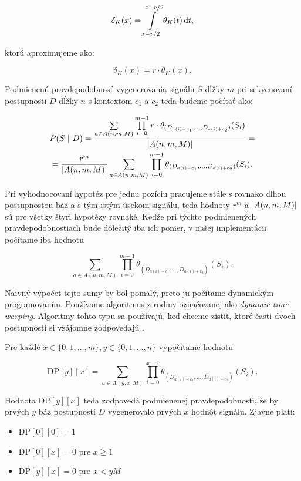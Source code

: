 $$\delta_K(x) = \int\limits_{x-r/2}^{x+r/2} \theta_K(t) \diff t \text{,}$$

ktorú aproximujeme ako:

$$\delta_K(x) = r \cdot \theta_K(x) \text{.}$$

Podmienenú pravdepodobnosť vygenerovania signálu $S$ dĺžky $m$ pri sekvenovaní postupnosti $D$ dĺžky $n$ s kontextom 
$c_1$ a $c_2$ teda budeme počítať ako:

\begin{multline*}
P(S ~|~ D) = \frac{\sum\limits_{a \in A(n, m, M)} \prod\limits_{i=0}^{m-1} r \cdot \theta_{(D_{a(i)-c_1}, \dots, D_{a(i)+c_2})}(S_i)}{\abs*{A(n, m, M)}} = \\
= \frac{r^m}{\abs*{A(n, m, M)}} \sum\limits_{a \in A(n, m, M)} \prod\limits_{i=0}^{m-1} \theta_{(D_{a(i)-c_1}, \dots, D_{a(i)+c_2})}(S_i) \text{.} 
\end{multline*}

Pri vyhodnocovaní hypotéz pre jednu pozíciu pracujeme stále s rovnako dlhou postupnosťou báz a s tým istým úsekom signálu, teda hodnoty
$r^m$ a $\abs*{A(n, m, M)}$ sú pre všetky štyri hypotézy rovnaké. Keďže pri týchto podmienených pravdepodobnostiach bude dôležitý iba ich
pomer, v našej implementácii počítame iba hodnotu

$$\sum\limits_{a \in A(n, m, M)} \prod\limits_{i=0}^{m-1} \theta_{(D_{a(i)-c_1}, \dots, D_{a(i)+c_2})}(S_i) \text{.}$$

Naivný výpočet tejto sumy by bol pomalý, preto ju počítame dynamickým programovaním.
Používame algoritmus z rodiny označovanej ako \emph{dynamic time warping}. Algoritmy tohto typu sa používajú, keď chceme zistiť,
ktoré časti dvoch postupností si vzájomne zodpovedajú \cite{DynamicTimeWarping}.

Pre každé $x \in \{0, 1, \dots, m\}, y \in \{0, 1, \dots, n\}$ vypočítame hodnotu

$$\textrm{DP}[y][x] = \sum\limits_{a \in A(y, x, M)} \prod\limits_{i=0}^{x-1} \theta_{(D_{a(i)-c_1}, \dots, D_{a(i)+c_2})}(S_i) \text{.}$$

Hodnota $\textrm{DP}[y][x]$ teda zodpovedá podmienenej pravdepodobnosti, že by prvých $y$ báz postupnosti $D$ vygenerovalo prvých $x$ hodnôt signálu.
Zjavne platí:
\begin{itemize}
\item $\textrm{DP}[0][0] = 1$
\item $\textrm{DP}[0][x] = 0$ pre $x \geq 1$
\item $\textrm{DP}[y][x] = 0$ pre $x < y M$
\end{itemize} 

